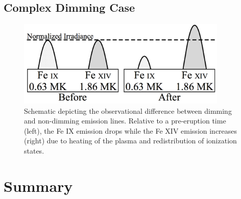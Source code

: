 \subsection{Complex Dimming Case}
 
\begin{figure}[!h]
	\caption[Schematic of thermal dimming]{
	    Schematic depicting the observational difference between dimming and non-dimming emission
	    lines. Relative to a pre-eruption time (left), the Fe IX emission drops while the Fe XIV
	    emission increases (right) due to heating of the plasma and redistribution of ionization
	    states.
	}
    \begin{center}
	    \includegraphics[width=100mm]{Images/ThermalDimming.png}
    \end{center}
    \label{thermalDimming}
\end{figure}

\section{Summary}
